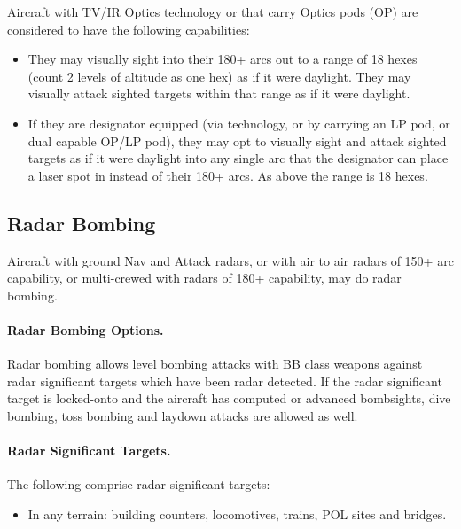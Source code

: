 \begin{advancedrules}
{Aircraft with TV/IR Optics technology or that carry Optics pods (OP) are considered to have the following capabilities:

\begin{itemize}

    \item They may visually sight into their 180+ arcs out to a range of 18 hexes (count 2 levels of altitude as one hex) as if it were daylight. They may visually attack sighted targets within that range as if it were daylight. 

    \item If they are designator equipped (via technology, or by carrying an LP pod, or dual capable OP/LP pod), they may opt to visually sight and attack sighted targets as if it were daylight into any single arc that the designator can place a laser spot in instead of their 180+ arcs. As above the range is 18 hexes.

\end{itemize}

\subsection{Radar Bombing}

Aircraft with ground Nav and Attack radars, or with air to air radars of 150+ arc capability, or multi-crewed with radars of 180+ capability, may do radar bombing.

\paragraph{Radar Bombing Options.} Radar bombing allows level bombing attacks with BB class weapons against radar significant targets which have been radar detected. If the radar significant target is locked-onto and the aircraft has computed or advanced bombsights, dive bombing, toss bombing and laydown attacks are allowed as well.

\paragraph{Radar Significant Targets.} The following comprise radar significant targets:

\begin{itemize}

    \item In any terrain: building counters, locomotives, trains, POL sites and bridges.


\end{itemize}}
\end{advancedrules}
